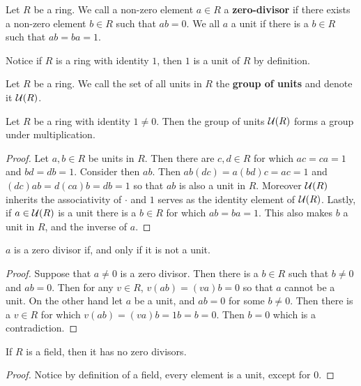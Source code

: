 \begin{definition}
  Let $R$ be a ring. We call a non-zero element $a \in R$ a
  \textbf{zero-divisor} if there exists a non-zero element $b \in R$
  such that $ab=0$. We all $a$ a unit if there is a $b \in R$ such
  that $ab=ba=1$.
\end{definition}

\begin{example}\label{example_5.2}
  Notice if $R$ is a ring with identity $1$, then $1$ is a unit of $R$ by
  definition.
\end{example}

\begin{definition}
  Let $R$ be a ring. We call the set of all units in  $R$ the \textbf{group
  of units} and denote it $\mathcal{U}(R)$.
\end{definition}

\begin{lemma}\label{lemma_5.1.2}
  Let $R$ be a ring with identity $1 \neq 0$. Then the group of units
  $\mathcal{U}(R)$ forms a group under multiplication.
\end{lemma}
\begin{proof}
  Let $a,b \in R$ be units in $R$. Then there are $c,d \in R$ for which
  $ac=ca=1$ and  $bd=db=1$. Consider then $ab$. Then  $ab(dc)=a(bd)c=ac=1$ and
  $(dc)ab=d(ca)b=db=1$ so that $ab$ is also a unit in $R$. Moreover $\mathcal{U}{(R)}$
  inherits the associativity of  $\cdot$ and $1$ serves as the identity
  element of $\mathcal{U}{(R)}$. Lastly, if $a \in \mathcal{U}{(R)}$ is a unit there is a $b
  \in R$ for which $ab=ba=1$. This also makes $b$ a unit in $R$, and the
  inverse of $a$.
\end{proof}
\begin{corollary}
  $a$ is a zero divisor if, and only if it is not a unit.
\end{corollary}

\begin{proof}
  Suppose that $a \neq 0$ is a zero divisor. Then there is a  $b \in R$ such
  that $b \neq 0$ and $ab=0$. Then for any $v \in R$,  $v(ab)=(va)b=0$ so that
  $a$ cannot be a unit. On the other hand let  $a$ be a unit, and  $ab=0$ for
  some  $b \neq 0$. Then there is a  $v \in R$ for which
  $v(ab)=(va)b=1b=b=0$. Then $b=0$ which is a contradiction.
\end{proof}
\begin{corollary}
  If $R$ is a field, then it has no zero divisors.
\end{corollary}
\begin{proof}
  Notice by definition of a field, every element is a unit, except for $0$.
\end{proof}

